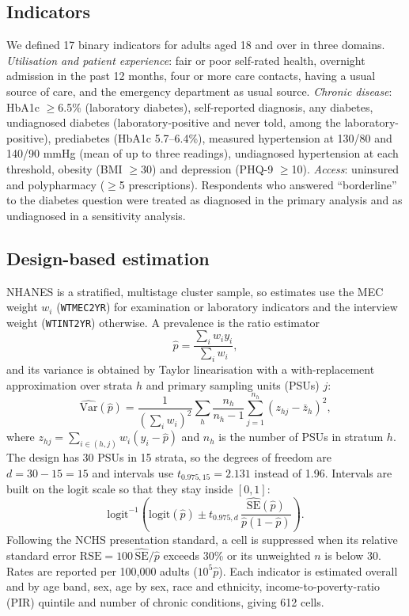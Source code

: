 \subsection{Indicators}
We defined 17 binary indicators for adults aged 18 and over in three domains. \textit{Utilisation and patient experience}: fair or poor self-rated health, overnight admission in the past 12 months, four or more care contacts, having a usual source of care, and the emergency department as usual source. \textit{Chronic disease}: HbA1c $\geq$6.5\% (laboratory diabetes), self-reported diagnosis, any diabetes, undiagnosed diabetes (laboratory-positive and never told, among the laboratory-positive), prediabetes (HbA1c 5.7--6.4\%), measured hypertension at 130/80 and 140/90 mmHg (mean of up to three readings), undiagnosed hypertension at each threshold, obesity (BMI $\geq$30) and depression (PHQ-9 $\geq$10). \textit{Access}: uninsured and polypharmacy ($\geq$5 prescriptions). Respondents who answered ``borderline'' to the diabetes question were treated as diagnosed in the primary analysis and as undiagnosed in a sensitivity analysis.

\subsection{Design-based estimation}
NHANES is a stratified, multistage cluster sample, so estimates use the MEC weight $w_i$ (\texttt{WTMEC2YR}) for examination or laboratory indicators and the interview weight (\texttt{WTINT2YR}) otherwise. A prevalence is the ratio estimator
\begin{equation}
\hat p = \frac{\sum_i w_i y_i}{\sum_i w_i},
\end{equation}
and its variance is obtained by Taylor linearisation with a with-replacement approximation over strata $h$ and primary sampling units (PSUs) $j$:
\begin{equation}
\widehat{\mathrm{Var}}(\hat p) = \frac{1}{\left(\sum_i w_i\right)^2}\sum_{h}\frac{n_h}{n_h-1}\sum_{j=1}^{n_h}\left(z_{hj}-\bar z_h\right)^2,
\end{equation}
where $z_{hj}=\sum_{i\in(h,j)} w_i (y_i-\hat p)$ and $n_h$ is the number of PSUs in stratum $h$. The design has 30 PSUs in 15 strata, so the degrees of freedom are $d=30-15=15$ and intervals use $t_{0.975,15}=2.131$ instead of 1.96. Intervals are built on the logit scale so that they stay inside $[0,1]$:
\begin{equation}
\mathrm{logit}^{-1}\!\left(\mathrm{logit}(\hat p)\pm t_{0.975,d}\,\frac{\widehat{\mathrm{SE}}(\hat p)}{\hat p(1-\hat p)}\right).
\end{equation}
Following the NCHS presentation standard, a cell is suppressed when its relative standard error $\mathrm{RSE}=100\,\widehat{\mathrm{SE}}/\hat p$ exceeds 30\% or its unweighted $n$ is below 30. Rates are reported per 100,000 adults ($10^5\hat p$). Each indicator is estimated overall and by age band, sex, age by sex, race and ethnicity, income-to-poverty-ratio (PIR) quintile and number of chronic conditions, giving 612 cells.

